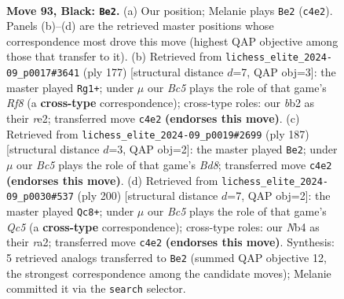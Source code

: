 \documentclass[11pt]{article}
\begin{document}
\clearpage

\begin{figure}[p]\centering
\begin{subfigure}{0.46\textwidth}\centering
\resizebox{\linewidth}{!}{%
\newchessgame
\chessboard[
  setfen={8/8/7k/8/1nb5/8/1B3PK1/8 b - - 32 93},
  showmover=false,
  pgfstyle=straightmove, color=movearrow, markmove={c4-e2}
]}
\caption{}
\end{subfigure}\hfill
\begin{subfigure}{0.46\textwidth}\centering
\resizebox{\linewidth}{!}{%
\newchessgame
\chessboard[
  setfen={8/8/8/3k2KP/8/8/4R3/5r2 b - - 20 89},
  showmover=false,
  pgfstyle=straightmove, color=movearrow, markmove={f1-g1}
]}
\caption{}
\end{subfigure}
\\[4pt]
\begin{subfigure}{0.46\textwidth}\centering
\resizebox{\linewidth}{!}{%
\newchessgame
\chessboard[
  setfen={6B1/8/8/8/3k4/P7/1K6/3b4 b - - 10 94},
  showmover=false,
  pgfstyle=straightmove, color=movearrow, markmove={d1-e2}
]}
\caption{}
\end{subfigure}\hfill
\begin{subfigure}{0.46\textwidth}\centering
\resizebox{\linewidth}{!}{%
\newchessgame
\chessboard[
  setfen={6k1/5p2/8/2Q5/5K2/8/r7/8 w - - 43 101},
  showmover=false,
  pgfstyle=straightmove, color=movearrow, markmove={c5-c8}
]}
\caption{}
\end{subfigure}
\caption{\textbf{Move 93, Black: \texttt{Be2}.} (a) Our position; Melanie plays \texttt{Be2} (\texttt{c4e2}). Panels (b)--(d) are the retrieved master positions whose correspondence most drove this move (highest QAP objective among those that transfer to it). (b) Retrieved from \texttt{lichess\_elite\_2024-09\_p0017\#3641} (ply 177) [structural distance $d$=7, QAP obj=3]: the master played \texttt{Rg1+}; under $\mu$ our \emph{Bc5} plays the role of that game's \emph{Rf8} (a \textbf{cross-type} correspondence); cross-type roles: our \emph{b}b2 as their \emph{r}e2; transferred move \texttt{c4e2} \textbf{(endorses this move)}. (c) Retrieved from \texttt{lichess\_elite\_2024-09\_p0019\#2699} (ply 187) [structural distance $d$=3, QAP obj=2]: the master played \texttt{Be2}; under $\mu$ our \emph{Bc5} plays the role of that game's \emph{Bd8}; transferred move \texttt{c4e2} \textbf{(endorses this move)}. (d) Retrieved from \texttt{lichess\_elite\_2024-09\_p0030\#537} (ply 200) [structural distance $d$=7, QAP obj=2]: the master played \texttt{Qc8+}; under $\mu$ our \emph{Bc5} plays the role of that game's \emph{Qc5} (a \textbf{cross-type} correspondence); cross-type roles: our \emph{N}b4 as their \emph{r}a2; transferred move \texttt{c4e2} \textbf{(endorses this move)}. Synthesis: 5 retrieved analogs transferred to \texttt{Be2} (summed QAP objective 12, the strongest correspondence among the candidate moves); Melanie committed it via the \texttt{search} selector.}
\label{fig:thought-m185}
\end{figure}
\end{document}
